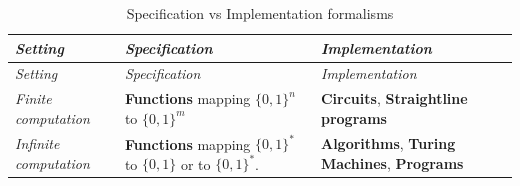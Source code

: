 \begin{longtable}[]{@{}lll@{}}
\caption{Specification vs Implementation formalisms}\tabularnewline
\toprule
\begin{minipage}[b]{0.16\columnwidth}\raggedright
\emph{Setting}\strut
\end{minipage} & \begin{minipage}[b]{0.43\columnwidth}\raggedright
\emph{Specification}\strut
\end{minipage} & \begin{minipage}[b]{0.32\columnwidth}\raggedright
\emph{Implementation}\strut
\end{minipage}\tabularnewline
\midrule
\endfirsthead
\toprule
\begin{minipage}[b]{0.16\columnwidth}\raggedright
\emph{Setting}\strut
\end{minipage} & \begin{minipage}[b]{0.43\columnwidth}\raggedright
\emph{Specification}\strut
\end{minipage} & \begin{minipage}[b]{0.32\columnwidth}\raggedright
\emph{Implementation}\strut
\end{minipage}\tabularnewline
\midrule
\endhead
\begin{minipage}[t]{0.16\columnwidth}\raggedright
\emph{Finite computation}\strut
\end{minipage} & \begin{minipage}[t]{0.43\columnwidth}\raggedright
\textbf{Functions} mapping \(\{0,1\}^n\) to \(\{0,1\}^m\)\strut
\end{minipage} & \begin{minipage}[t]{0.32\columnwidth}\raggedright
\textbf{Circuits}, \textbf{Straightline programs}\strut
\end{minipage}\tabularnewline
\begin{minipage}[t]{0.16\columnwidth}\raggedright
\emph{Infinite computation}\strut
\end{minipage} & \begin{minipage}[t]{0.43\columnwidth}\raggedright
\textbf{Functions} mapping \(\{0,1\}^*\) to \(\{0,1\}\) or to
\(\{0,1\}^*\).\strut
\end{minipage} & \begin{minipage}[t]{0.32\columnwidth}\raggedright
\textbf{Algorithms}, \textbf{Turing Machines}, \textbf{Programs}\strut
\end{minipage}\tabularnewline
\bottomrule
\end{longtable}

